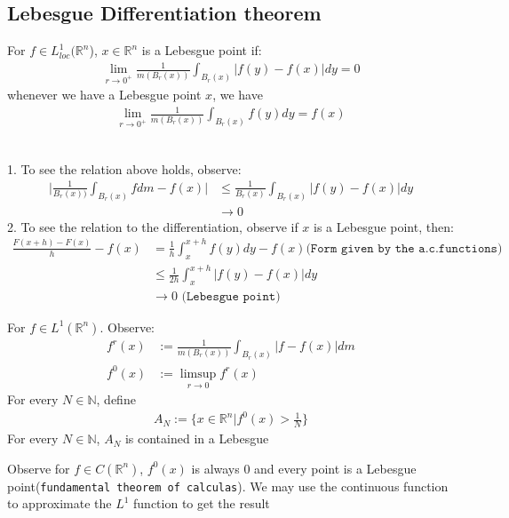 \subsection{Lebesgue Differentiation theorem}
\begin{definition}
	For $f \in L_{loc}^1(\mathbb{R}^n$), $ x \in \mathbb{R}^n$ is a Lebesgue point if:
	\begin{align*}
		\lim_{r \rightarrow 0^+}\frac{1}{m(B_r(x))} \int_{B_r(x)}|f(y) - f(x)|dy = 0
	\end{align*}
	whenever we have a Lebesgue point $x$, we have
	\begin{align*}
		\lim_{r \rightarrow 0^+}\frac{1}{m(B_r(x))} \int_{B_r(x)} f(y) dy = f(x)
	\end{align*}
\end{definition}
\begin{remark}
\quad\\
1. To see the relation above holds, observe:
\begin{align*}
	\bigg|\frac{1}{B_r(x))}\int_{B_r(x)} f dm - f(x)\bigg| &\le 
	\frac{1}{B_r(x)} \int_{B_r(x)} |f(y) - f(x)|dy\\
	&\rightarrow 0
\end{align*}
2. To see the relation to the differentiation, observe if $x$ is a Lebesgue point, then:
\begin{align*}
	\frac{F(x + h) - F(x)}{h} - f(x) &= \frac{1}{h} \int_x^{x + h}f(y) dy - f(x)\texttt{(Form given by the a.c.functions)}\\
	&\le \frac{1}{2h}\int_x^{x + h} |f(y) - f(x)| dy \\
	& \rightarrow 0 \texttt{ (Lebesgue point)}
\end{align*}
\end{remark}

\begin{lemma}
	For $f \in L^1(\mathbb{R}^n)$. Observe:
	\begin{align*}
		f^r(x)&:= \frac{1}{m(B_r(x))} \int_{B_r(x)} |f - f(x)|dm\\ f^0(x)&:= \limsup_{r \rightarrow 0}f^r(x) 
	\end{align*}
	For every $N \in \mathbb{N}$, define
	\begin{align*}
		A_N:= \bigg\{x \in \mathbb{R}^n| f^0(x) > \frac{1}{N}\bigg\}
	\end{align*}
	For every $N \in \mathbb{N}$, $A_N$ is contained in a Lebesgue  
\end{lemma}
\begin{remark}
Observe for $f \in C(\mathbb{R}^n)$, $f^0(x)$ is always 0 and every point is a Lebesgue point(\texttt{fundamental theorem of calculas}). We may use the continuous function to approximate the $L^1$ function to get the result	
\end{remark}

